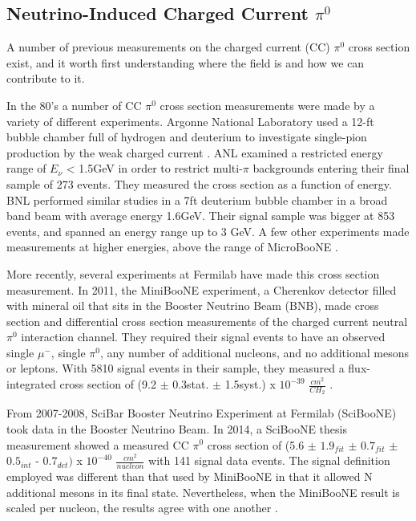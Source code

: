 \documentclass[12pt]{article}
\begin{document}
\subsection{Neutrino-Induced Charged Current $\pi^0$}
A number of previous measurements on the charged current (CC) $\pi^0$ cross section exist, and it worth first understanding where the field is and how we can contribute to it.  
\par In the 80's a number of CC $\pi^0$ cross section measurements were made by a variety of different experiments.  Argonne National Laboratory used a 12-ft bubble chamber full of hydrogen and deuterium to investigate single-pion production by the weak charged current \cite{bib:ANL1} \cite{bib:ANL2}. ANL examined a restricted energy range of $E_\nu$ < 1.5GeV in order to restrict multi-$\pi$ backgrounds entering their final sample of 273 events. They measured the cross section as a function of energy. BNL performed similar studies in a 7ft deuterium bubble chamber in a broad band beam with average energy 1.6GeV. Their signal sample was bigger at 853 events, and spanned an energy range up to 3 GeV. A few other experiments made measurements at higher energies, above the range of MicroBooNE \cite{bib:HE_unknown1} \cite{bib:HE_unknown2}.
\par More recently, several experiments at Fermilab have made this cross section measurement. In 2011, the MiniBooNE experiment, a Cherenkov detector filled with mineral oil that sits in the Booster Neutrino Beam (BNB), made cross section and differential cross section measurements of the charged current neutral $\pi^0$ interaction channel. They required their signal events to have an observed single $\mu^-$, single $\pi^0$, any number of additional nucleons, and no additional mesons or leptons. With 5810 signal events in their sample, they measured a flux-integrated cross section of (9.2 $\pm$ 0.3stat. $\pm$ 1.5syst.) x $10^{-39}$ $\frac{cm^2}{CH_2}$ \cite{bib:numucc_miniboone} \cite{bib:miniboone_thesis}.  
\par From 2007-2008, SciBar Booster Neutrino Experiment at Fermilab (SciBooNE) took data in the Booster Neutrino Beam.  In 2014, a SciBooNE thesis measurement showed a measured CC $\pi^0$ cross section of (5.6 $\pm$ $1.9_{fit}$ $\pm$ $0.7_{fit}$ $\pm$ $0.5_{int}$ - $0.7_{det})$ x $10^{-40}$ $\frac{cm^2}{nucleon}$ with 141 signal data events. The signal definition employed was different than that used by MiniBooNE in that it allowed N additional mesons in its final state.  Nevertheless, when the MiniBooNE result is scaled per nucleon, the results agree with one another \cite{bib:sciboone_thesis}.
\end{document}
